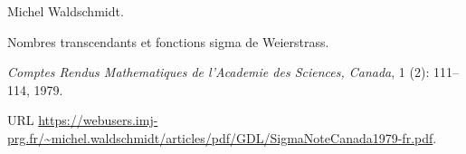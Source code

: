 Michel Waldschmidt.

\newblock Nombres transcendants et fonctions sigma de {Weierstrass}.

\newblock \emph{Comptes Rendus Mathematiques de l'Academie des Sciences,
  Canada}, 1 (2): 111--114, 1979.

\newblock URL
  \url{https://webusers.imj-prg.fr/~michel.waldschmidt/articles/pdf/GDL/SigmaNoteCanada1979-fr.pdf}.
